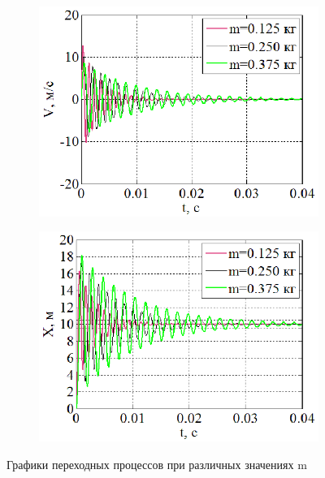 \documentclass[a4paper,12pt]{article} %
\begin{document}
\begin{figure}[H]
\begin{subfigure}[b]{0.48\textwidth}
	\end{subfigure}
	\begin{subfigure}[b]{0.48\textwidth}
		\includegraphics[width = \textwidth]{scheme/V1}
	\end{subfigure}
	\hfill
	\begin{subfigure}[b]{0.48\textwidth}
		\includegraphics[width = \textwidth]{scheme/X1}
	\end{subfigure}
	\caption{Графики переходных процессов при различных значениях m}
	\label{UFVX1}
\end{figure}
\end{document}
